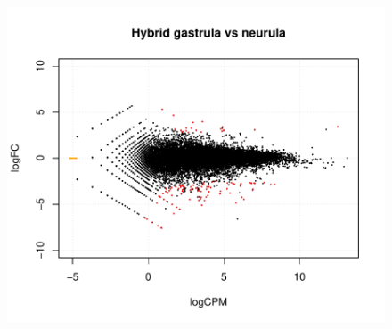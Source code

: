 \begin{landscape}
\begin{figure}[!H]
{	\includegraphics[scale=0.45]{figures/hyb3v4_graph.pdf}
	}
	\hfill
	\subfloat[\label{subfig:mocu4v6}]{%
}
\end{figure}
\end{landscape}
